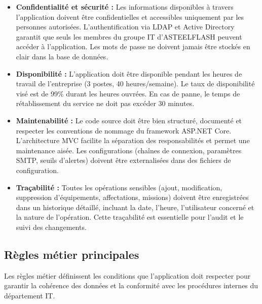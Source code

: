\begin{itemize}[label=\textbullet,font=\normalsize]
        \item \textbf{Confidentialit\'{e} et s\'{e}curit\'{e} :} Les informations disponibles \`{a} travers l'application doivent \^{e}tre confidentielles et accessibles uniquement par les personnes autoris\'{e}es. L'authentification via LDAP et Active Directory garantit que seuls les membres du groupe IT d'ASTEELFLASH peuvent acc\'{e}der \`{a} l'application. Les mots de passe ne doivent jamais \^{e}tre stock\'{e}s en clair dans la base de donn\'{e}es.

        \item \textbf{Disponibilit\'{e} :} L'application doit \^{e}tre disponible pendant les heures de travail de l'entreprise (3 postes, 40 heures/semaine). Le taux de disponibilit\'{e} vis\'{e} est de 99\% durant les heures ouvr\'{e}es. En cas de panne, le temps de r\'{e}tablissement du service ne doit pas exc\'{e}der 30 minutes.

        \item \textbf{Maintenabilit\'{e} :} Le code source doit \^{e}tre bien structur\'{e}, document\'{e} et respecter les conventions de nommage du framework ASP.NET Core. L'architecture MVC facilite la s\'{e}paration des responsabilit\'{e}s et permet une maintenance ais\'{e}e. Les configurations (cha\^{i}nes de connexion, param\`{e}tres SMTP, seuils d'alertes) doivent \^{e}tre externalis\'{e}es dans des fichiers de configuration.

        \item \textbf{Tra\c{c}abilit\'{e} :} Toutes les op\'{e}rations sensibles (ajout, modification, suppression d'\'{e}quipements, affectations, missions) doivent \^{e}tre enregistr\'{e}es dans un historique d\'{e}taill\'{e}, incluant la date, l'heure, l'utilisateur concern\'{e} et la nature de l'op\'{e}ration. Cette tra\c{c}abilit\'{e} est essentielle pour l'audit et le suivi des changements.

        \end{itemize}

\subsection{Règles métier principales}

Les règles métier définissent les conditions que l'application doit respecter pour garantir la cohérence des données et la conformité avec les procédures internes du département IT.


